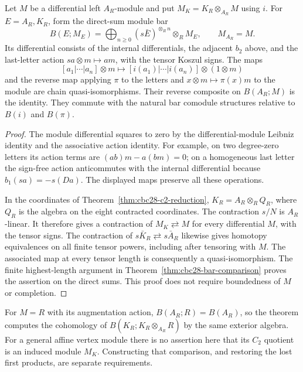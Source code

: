 \begin{theorem}\label{thm:cbc28-module-bar}
Let $M$ be a differential left $A_R$-module and put
$M_K=K_R\otimes_{A_R}M$ using $i$.
For $E=A_R,K_R$, form the direct-sum module bar
\[
 B(E;M_E)=\bigoplus_{n\geq0}(s\bar E)^{\otimes_R n}\otimes_R M_E,
 \qquad M_{A_R}=M.
\]
Its differential consists of the internal differentials, the adjacent $b_2$ above, and the last-letter action
$sa\otimes m\mapsto am$, with the tensor Koszul signs.
The maps
\[
 [a_1|\cdots|a_n]\otimes m
 \longmapsto [i(a_1)|\cdots|i(a_n)]\otimes(1\otimes m)
\]
and the reverse map applying $\pi$ to the letters and $x\otimes m\mapsto\pi(x)m$ to the module are chain quasi-isomorphisms.
Their reverse composite on $B(A_R;M)$ is the identity.
They commute with the natural bar comodule structures relative to $B(i)$ and $B(\pi)$.
\end{theorem}
\begin{proof}
The module differential squares to zero by the differential-module Leibniz identity and the associative action identity.
For example, on two degree-zero letters its action terms are
$(ab)m-a(bm)=0$; on a homogeneous last letter the sign-free action anticommutes with the internal differential because $b_1(sa)=-s(Da)$.
The displayed maps preserve all these operations.

In the coordinates of Theorem~\ref{thm:cbc28-c2-reduction}, $K_R=A_R\otimes_R Q_R$, where $Q_R$ is the algebra on the eight contracted coordinates.
The contraction $s/N$ is $A_R$-linear.
It therefore gives a contraction of $M_K\rightleftarrows M$ for every differential $M$, with the tensor signs.
The contraction of $s\bar K_R\rightleftarrows s\bar A_R$ likewise gives homotopy equivalences on all finite tensor powers, including after tensoring with $M$.
The associated map at every tensor length is consequently a quasi-isomorphism.
The finite highest-length argument in Theorem~\ref{thm:cbc28-bar-comparison} proves the assertion on the direct sums.
This proof does not require boundedness of $M$ or completion.
\end{proof}

For $M=R$ with its augmentation action, $B(A_R;R)=B(A_R)$, so the theorem computes the cohomology of $B(K_R;K_R\otimes_{A_R}R)$ by the same exterior algebra.
For a general affine vertex module there is no assertion here that its $C_2$ quotient is an induced module $M_K$.
Constructing that comparison, and restoring the lost first products, are separate requirements.

